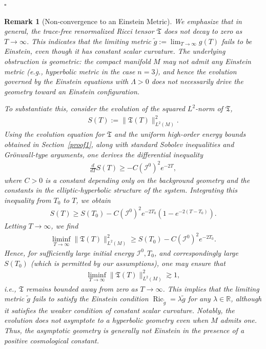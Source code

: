 \documentclass{amsart}
\newtheorem{remark}{Remark}
\begin{document}
\hfill$\square$
\begin{remark}[Non-convergence to an Einstein Metric]
\label{noconvergence}
We emphasize that in general, the trace-free renormalized Ricci tensor $\mathfrak{T}$ does not decay to zero as $T \to \infty$. This indicates that the limiting metric $\widetilde{g} := \lim_{T \to \infty} g(T)$ fails to be Einstein, even though it has constant scalar curvature. The underlying obstruction is geometric: the compact manifold $M$ may not admit any Einstein metric (e.g., hyperbolic metric in the case $n=3$), and hence the evolution governed by the Einstein equations with $\Lambda > 0$ does not necessarily drive the geometry toward an Einstein configuration.

\noindent To substantiate this, consider the evolution of the squared $L^2$-norm of $\mathfrak{T}$,
\begin{align}
S(T) := \| \mathfrak{T}(T) \|_{L^2(M)}^2.
\end{align}
Using the evolution equation for $\mathfrak{T}$ and the uniform high-order energy bounds obtained in Section~\ref{proof1}, along with standard Sobolev inequalities and Grönwall-type arguments, one derives the differential inequality
\begin{align}
\frac{d}{dT} S(T) \geq -C (\mathcal{I}^0)^2 e^{-2T},
\end{align}
where $C>0$ is a constant depending only on the background geometry and the constants in the elliptic-hyperbolic structure of the system. Integrating this inequality from $T_0$ to $T$, we obtain
\begin{align}
S(T) \geq S(T_0) - C (\mathcal{I}^0)^2 e^{-2T_0} \left(1 - e^{-2(T - T_0)}\right).
\end{align}
Letting $T \to \infty$, we find
\begin{align}
\liminf_{T \to \infty} \| \mathfrak{T}(T) \|_{L^2(M)}^2 \geq S(T_0) - C (\mathcal{I}^0)^2 e^{-2T_0}.
\end{align}
Hence, for sufficiently large initial energy $\mathcal{I}^0, T_{0}$, and correspondingly large $S(T_0)$ (which is permitted by our assumptions), one may ensure that
\begin{align}
\liminf_{T \to \infty} \| \mathfrak{T}(T) \|_{L^2(M)}^2 \gtrsim 1,
\end{align}
i.e., $\mathfrak{T}$ remains bounded away from zero as $T \to \infty$. This implies that the limiting metric $\widetilde{g}$ fails to satisfy the Einstein condition $\operatorname{Ric}_{\widetilde{g}} = \lambda \widetilde{g}$ for any $\lambda \in \mathbb{R}$, although it satisfies the weaker condition of constant scalar curvature. Notably, the evolution does not asymptote to a hyperbolic geometry even when $M$ admits one. Thus, the asymptotic geometry is generally not Einstein in the presence of a positive cosmological constant.
\end{remark}
\end{document}
